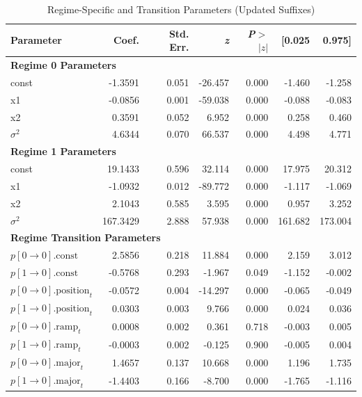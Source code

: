 \documentclass{article}
\begin{document}
\begin{table}[htbp]
\centering
\caption{Regime-Specific and Transition Parameters (Updated Suffixes)}
\label{tab:regime_parameters_updated}
\begin{tabular}{lrrrrrr}
\toprule
\textbf{Parameter} & \textbf{Coef.} & \textbf{Std. Err.} & \textbf{\textit{z}} & \textbf{\textit{P}$>$\textit{$|z|$}} & \textbf{[0.025} & \textbf{0.975]} \\
\midrule
\multicolumn{7}{l}{\textbf{Regime 0 Parameters}} \\
\midrule
const  & -1.3591 & 0.051 & -26.457 & 0.000 & -1.460 & -1.258 \\
x1     & -0.0856 & 0.001 & -59.038 & 0.000 & -0.088 & -0.083 \\
x2     &  0.3591 & 0.052 &   6.952 & 0.000 &  0.258 &  0.460 \\
$\sigma^2$ &  4.6344 & 0.070 &  66.537 & 0.000 &  4.498 &  4.771 \\
\midrule
\multicolumn{7}{l}{\textbf{Regime 1 Parameters}} \\
\midrule
const  &  19.1433 & 0.596 &  32.114 & 0.000 &  17.975 &  20.312 \\
x1     &  -1.0932 & 0.012 & -89.772 & 0.000 &  -1.117 &  -1.069 \\
x2     &   2.1043 & 0.585 &   3.595 & 0.000 &   0.957 &   3.252 \\
$\sigma^2$ & 167.3429 & 2.888 &  57.938 & 0.000 & 161.682 & 173.004 \\
\midrule
\multicolumn{7}{l}{\textbf{Regime Transition Parameters}} \\
\midrule
$p[0 \rightarrow 0].\text{const}$ &   2.5856 & 0.218 &  11.884 & 0.000 &   2.159 &   3.012 \\
$p[1 \rightarrow 0].\text{const}$ &  -0.5768 & 0.293 &  -1.967 & 0.049 &  -1.152 &  -0.002 \\
$p[0 \rightarrow 0].\text{position}_t$ &  -0.0572 & 0.004 & -14.297 & 0.000 &  -0.065 &  -0.049 \\
$p[1 \rightarrow 0].\text{position}_t$ &   0.0303 & 0.003 &   9.766 & 0.000 &   0.024 &   0.036 \\
$p[0 \rightarrow 0].\text{ramp}_t$ &   0.0008 & 0.002 &   0.361 & 0.718 &  -0.003 &   0.005 \\
$p[1 \rightarrow 0].\text{ramp}_t$ &  -0.0003 & 0.002 &  -0.125 & 0.900 &  -0.005 &   0.004 \\
$p[0 \rightarrow 0].\text{major}_t$ &   1.4657 & 0.137 &  10.668 & 0.000 &   1.196 &   1.735 \\
$p[1 \rightarrow 0].\text{major}_t$ &  -1.4403 & 0.166 &  -8.700 & 0.000 &  -1.765 &  -1.116 \\

\end{tabular}
\end{table}
\end{document}

